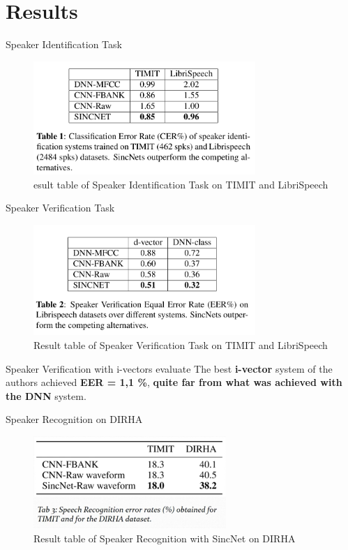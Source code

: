 \documentclass[11pt]{beamer}
\begin{document}
\section{Results}
\begin{frame}{Speaker Identification Task}
	\begin{figure}[H]
		\centering
		\includegraphics[width=0.75\textwidth]{images/performance_speaker_identification.png}
		\caption{esult table of Speaker Identification Task on TIMIT and LibriSpeech}
		\label{fig:writing-thesis}
	\end{figure}	
\end{frame}
\begin{frame}{Speaker Verification Task}
	\begin{figure}[H]
		\centering
		\includegraphics[width=0.75\textwidth]{images/performance_speaker_verification.png}
		\caption{Result table of Speaker Verification Task on TIMIT and LibriSpeech}
		\label{fig:writing-thesis}
	\end{figure}	
\end{frame}
\begin{frame}{Speaker Verification with i-vectors evaluate}
	The best \textbf {i-vector} system of the authors achieved \textbf{EER = 1,1 \%}, \textbf{quite far from what was achieved with the DNN} system.
\end{frame}
\begin{frame}{Speaker Recognition on DIRHA}
	\begin{figure}[H]
		\centering
		\includegraphics[width=0.65\textwidth]{images/sr_sincnet_result.png}
		\caption{Result table of Speaker Recognition with SincNet on DIRHA}
		\label{fig:writing-thesis}
	\end{figure}	
\end{frame}
\end{document}
